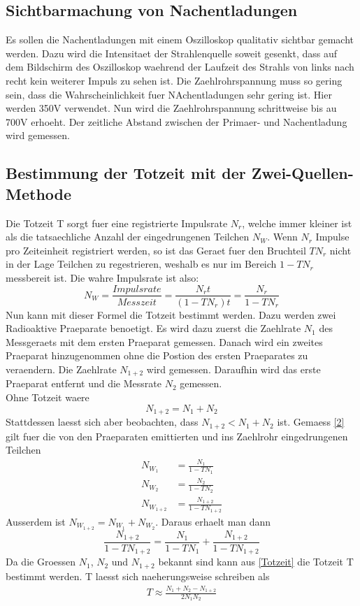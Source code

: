 \documentclass[titlepage=firstcover, captions=tableheading]{scrartcl}
\begin{document}
\subsection{Sichtbarmachung von Nachentladungen}
Es sollen die Nachentladungen mit einem Oszilloskop qualitativ sichtbar gemacht werden. Dazu wird die Intensitaet der Strahlenquelle soweit gesenkt, dass auf dem Bildschirm des Oszilloskop waehrend der Laufzeit des Strahls von links nach recht kein weiterer Impuls zu sehen ist. Die Zaehlrohrspannung muss so gering sein, dass die Wahrscheinlichkeit fuer NAchentladungen sehr gering ist. Hier werden 350V verwendet. Nun wird die Zaehlrohrspannung schrittweise bis au 700V erhoeht. Der zeitliche Abstand zwischen der Primaer- und Nachentladung wird gemessen.
\subsection{Bestimmung der Totzeit mit der Zwei-Quellen-Methode}
Die Totzeit T sorgt fuer eine registrierte Impulsrate $N_r$, welche immer kleiner ist als die tatsaechliche Anzahl der eingedrungenen Teilchen $N_W$. Wenn $N_r$ Impulse pro Zeiteinheit registriert werden, so ist das Geraet fuer den Bruchteil $TN_r$ nicht in der Lage Teilchen zu regestrieren, weshalb es nur im Bereich $1-TN_r$ messbereit ist. Die wahre Impulsrate ist also:
\begin{equation}\label{2}
    N_W=\frac{Impulsrate}{Messzeit}=\frac{N_rt}{(1-TN_r)t}=\frac{N_r}{1-TN_r}
\end{equation}
Nun kann mit dieser Formel die Totzeit bestimmt werden. Dazu werden zwei Radioaktive Praeparate benoetigt. Es wird dazu zuerst die Zaehlrate $N_1$ des Messgeraets mit dem ersten Praeparat gemessen. Danach wird ein zweites Praeparat hinzugenommen ohne die Postion des ersten Praeparates zu veraendern. Die Zaehlrate $N_{1+2}$ wird gemessen. Daraufhin wird das erste Praeparat entfernt und die Messrate $N_2$ gemessen.\\
Ohne Totzeit waere 
\begin{equation}
    N_{1+2}=N_1+N_2\nonumber
\end{equation}
Stattdessen laesst sich aber beobachten, dass $N_{1+2}<N_1+N_2$ ist. Gemaess \ref{2} gilt fuer die von den Praeparaten emittierten und ins Zaehlrohr eingedrungenen Teilchen
\begin{align}
    N_{W_1}&=\frac{N_1}{1-TN_1}\nonumber\\
    N_{W_2}&=\frac{N_2}{1-TN_2}\nonumber\\
    N_{W_{1+2}}&=\frac{N_{1+2}}{1-TN_{1+2}}\nonumber
\end{align}
Ausserdem ist $N_{W_{1+2}}=N_{W_1}+N_{W_2}$. Daraus erhaelt man dann
\begin{equation}\label{Totzeit}
    \frac{N_{1+2}}{1-TN_{1+2}}=\frac{N_1}{1-TN_1}+\frac{N_{1+2}}{1-TN_{1+2}}
\end{equation}
Da die Groessen $N_1$, $N_2$ und $N_{1+2}$ bekannt sind kann aus \ref{Totzeit} die Totzeit T bestimmt werden. T laesst sich naeherungsweise schreiben als 
\begin{align}
    T\approx\frac{N_1+N_2-N_{1+2}}{2N_1N_2}
\end{align}
\end{document}
